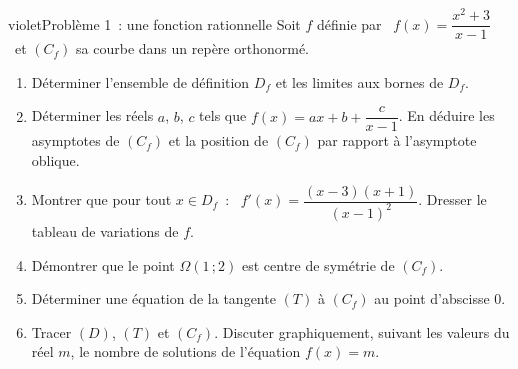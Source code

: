 \begin{exo}{violet}{Problème 1~: une fonction rationnelle }
Soit $f$ définie par \ $f(x)=\dfrac{x^2+3}{x-1}$ \ et $(C_f)$ sa courbe dans un repère orthonormé.
\begin{enumerate}
  \item Déterminer l'ensemble de définition $D_f$ et les limites aux bornes de $D_f$.
  \item Déterminer les réels $a$, $b$, $c$ tels que $f(x)=ax+b+\dfrac{c}{x-1}$. En déduire les asymptotes de $(C_f)$ et la position de $(C_f)$ par rapport à l'asymptote oblique.
  \item Montrer que pour tout $x\in D_f$~: \ $f'(x)=\dfrac{(x-3)(x+1)}{(x-1)^2}$. Dresser le tableau de variations de $f$.
  \item Démontrer que le point $\Omega(1\,;2)$ est centre de symétrie de $(C_f)$.
  \item Déterminer une équation de la tangente $(T)$ à $(C_f)$ au point d'abscisse $0$.
  \item Tracer $(D)$, $(T)$ et $(C_f)$. Discuter graphiquement, suivant les valeurs du réel $m$, le nombre de solutions de l'équation $f(x)=m$.
\end{enumerate}
\end{exo}

